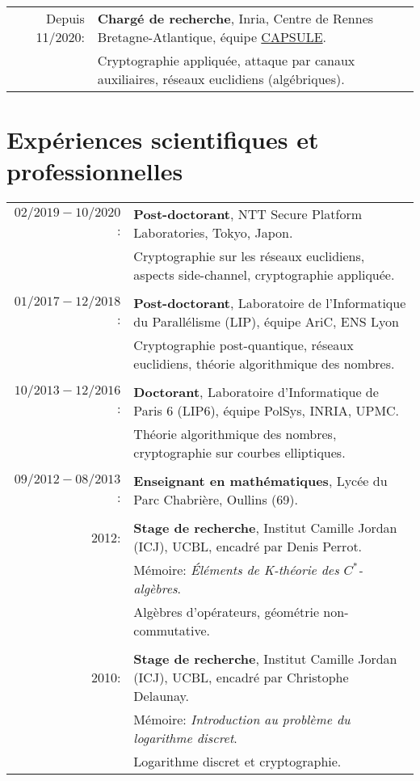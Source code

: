 \documentclass[11pt]{article}
\begin{document}
\hspace{-0.6cm} \begin{tabular}{rl}
Depuis 11/2020:  & \textbf{Chargé de recherche}, Inria, Centre de Rennes Bretagne-Atlantique, équipe \href{https://team.inria.fr/capsule/}{CAPSULE}.\\
                  & Cryptographie appliquée, attaque par canaux auxiliaires, réseaux euclidiens (algébriques).
\end{tabular}

\smallskip
\section{Expériences scientifiques et professionnelles}
\hspace{-0.9cm} \begin{tabular}{rl}
                  $02/2019 - 10/2020$:& \textbf{Post-doctorant}, NTT Secure Platform Laboratories, Tokyo, Japon.\\
                                      & Cryptographie sur les réseaux euclidiens, aspects side-channel, cryptographie appliquée.\\
                  &\\
                  
                  $01/2017 -12/2018$: & \textbf{Post-doctorant}, Laboratoire de l'Informatique du Parallélisme (LIP), équipe AriC, ENS Lyon\\
                  & Cryptographie post-quantique, réseaux euclidiens, théorie algorithmique des nombres.\\
          &\\
                  $10/2013-12/2016$: & \textbf{Doctorant}, Laboratoire d'Informatique de Paris 6 (LIP6), équipe PolSys, INRIA, UPMC.\\
          & Théorie algorithmique des nombres, cryptographie sur courbes elliptiques.\\
          &\\
                  $09/2012-08/2013$: & \textbf{Enseignant en mathématiques}, Lycée du Parc Chabrière, Oullins (69).\\
          &\\
                 2012: & \textbf{Stage de recherche}, Institut Camille Jordan (ICJ), UCBL, encadré par Denis Perrot.\\
                                   & Mémoire: {\em \'Eléments de K-théorie des $C^*$-algèbres}.\\
          & Algèbres d'opérateurs, géométrie non-commutative.\\
                                 &\\
                 2010: & \textbf{Stage de recherche}, Institut Camille Jordan (ICJ), UCBL, encadré par Christophe Delaunay.\\
                                  & Mémoire: {\em Introduction au problème du logarithme discret}.\\
          & Logarithme discret et cryptographie.
\end{tabular}
\end{document}
